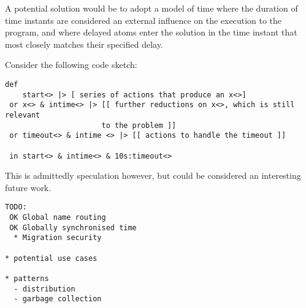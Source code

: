 A potential solution would be to adopt a model of time where the duration of
time instants are considered an external influence on the execution to the
program, and where delayed atoms enter the solution in the time instant that
most closely matches their specified delay.

Consider the following code sketch:
\begin{verbatim}
def
    start<> |> [ series of actions that produce an x<>]
 or x<> & intime<> |> [[ further reductions on x<>, which is still relevant
                      to the problem ]]
 or timeout<> & intime <> |> [[ actions to handle the timeout ]]

 in start<> & intime<> & 10s:timeout<>
\end{verbatim}

This is admittedly speculation however, but could be considered an interesting
future work.

\begin{verbatim}
TODO:
 OK Global name routing
 OK Globally synchronised time
  * Migration security

* potential use cases

* patterns
  - distribution
  - garbage collection
\end{verbatim}
